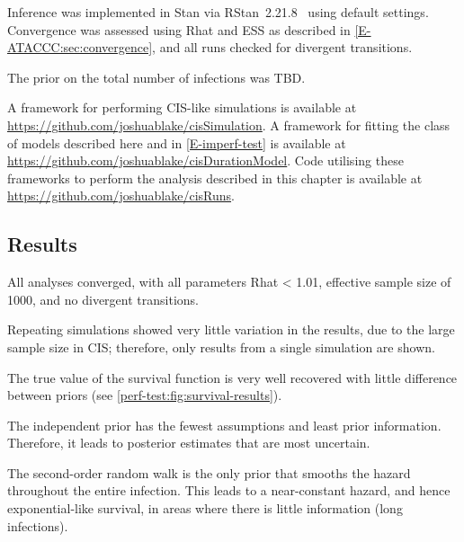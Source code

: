 \documentclass[thesis.tex]{subfiles}
\begin{document}
Inference was implemented in Stan via RStan~2.21.8~\autocite{rstan2-21-8} using default settings.
Convergence was assessed using Rhat and ESS as described in \cref{E-ATACCC:sec:convergence}, and all runs checked for divergent transitions.

The prior on the total number of infections was TBD.

A framework for performing CIS-like simulations is available at \url{https://github.com/joshuablake/cisSimulation}.
A framework for fitting the class of models described here and in \cref{E-imperf-test} is available at \url{https://github.com/joshuablake/cisDurationModel}.
Code utilising these frameworks to perform the analysis described in this chapter is available at \url{https://github.com/joshuablake/cisRuns}.

\subsection{Results}

All analyses converged, with all parameters Rhat < 1.01, effective sample size of 1000, and no divergent transitions.

Repeating simulations showed very little variation in the results, due to the large sample size in CIS; therefore, only results from a single simulation are shown.

The true value of the survival function is very well recovered with little difference between priors (see \cref{perf-test:fig:survival-results}).

The independent prior has the fewest assumptions and least prior information.
Therefore, it leads to posterior estimates that are most uncertain.

The second-order random walk is the only prior that smooths the hazard throughout the entire infection.
This leads to a near-constant hazard, and hence exponential-like survival, in areas where there is little information (long infections).
\end{document}

